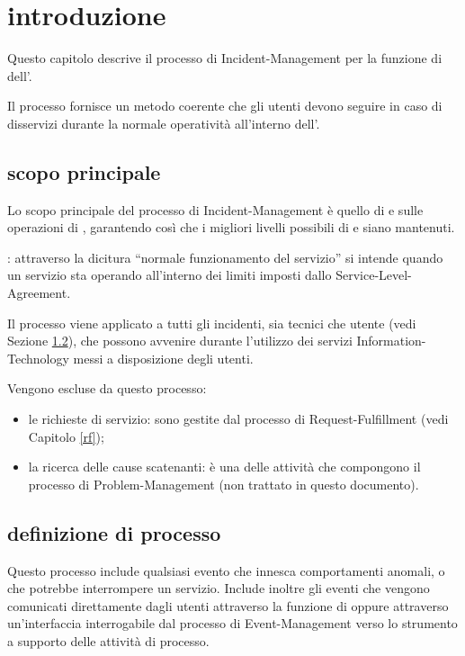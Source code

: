 %
%
\section[Introduzione]{introduzione}
\label{im-introduction}
Questo capitolo descrive il processo di \acf{Incident-Management} per la funzione di  dell'\entity{}.

Il processo fornisce un metodo coerente che gli utenti devono seguire in caso di disservizi durante la normale operatività all'interno dell'\entity{}.

\subsection[Scopo principale]{scopo principale}
\label{im-introduction-scope}
Lo scopo principale del processo di \ac{Incident-Management} è quello di  e  sulle operazioni di , garantendo così che i migliori livelli possibili di  e  siano mantenuti.

: attraverso la dicitura ``normale funzionamento del servizio'' si intende quando un servizio sta operando all'interno dei limiti imposti dallo \ac{Service-Level-Agreement}.

Il processo viene applicato a tutti gli incidenti, sia tecnici che utente (vedi Sezione \ref{im-introduction-definition}), che possono avvenire durante l'utilizzo dei servizi \acs{Information-Technology} messi a disposizione degli utenti.

Vengono escluse da questo processo:

\begin{itemize}
\item{le richieste di servizio: sono gestite dal processo di \acf{Request-Fulfillment} (vedi Capitolo \ref{rf});}
\item{la ricerca delle cause scatenanti: è una delle attività che compongono il processo di \acf{Problem-Management} (non trattato in questo documento).}
\end{itemize}

\subsection[Definizione di processo]{definizione di processo}
\label{im-introduction-definition}
Questo processo include qualsiasi evento che innesca comportamenti anomali, o che potrebbe interrompere un servizio. Include inoltre gli eventi che vengono comunicati direttamente dagli utenti attraverso la funzione di  oppure attraverso un'interfaccia interrogabile dal processo di \ac{Event-Management} verso lo strumento a supporto delle attività di processo.

